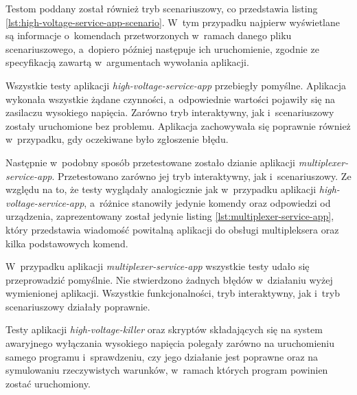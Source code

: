 Testom poddany został również tryb scenariuszowy, co przedstawia listing \ref{lst:high-voltage-service-app-scenario}. W~tym przypadku najpierw wyświetlane są informacje o~komendach przetworzonych w~ramach danego pliku scenariuszowego, a~dopiero później następuje ich uruchomienie, zgodnie ze specyfikacją zawartą w~argumentach wywołania aplikacji.



Wszystkie testy aplikacji \emph{high-voltage-service-app} przebiegły pomyślne. Aplikacja wykonała wszystkie żądane czynności, a~odpowiednie wartości pojawiły się na zasilaczu wysokiego napięcia. Zarówno tryb interaktywny, jak i~scenariuszowy zostały uruchomione bez problemu. Aplikacja zachowywała się poprawnie również w~przypadku, gdy oczekiwane było zgłoszenie błędu.

\clearpage
Następnie w~podobny sposób przetestowane zostało dzianie aplikacji \emph{multiplexer-service-app}. Przetestowano zarówno jej tryb interaktywny, jak i~scenariuszowy. Ze względu na to, że testy wyglądały analogicznie jak w~przypadku aplikacji \emph{high-voltage-service-app}, a~różnice stanowiły jedynie komendy oraz odpowiedzi od urządzenia, zaprezentowany został jedynie listing \ref{lst:multiplexer-service-app}, który przedstawia wiadomość powitalną aplikacji do obsługi multipleksera oraz kilka podstawowych komend.



W~przypadku aplikacji \emph{multiplexer-service-app} wszystkie testy udało się przeprowadzić pomyślnie. Nie stwierdzono żadnych błędów w~działaniu wyżej wymienionej aplikacji. Wszystkie funkcjonalności, tryb interaktywny, jak i~tryb scenariuszowy działały poprawnie.

\clearpage
Testy aplikacji \emph{high-voltage-killer} oraz skryptów składających się na system awaryjnego wyłączania wysokiego napięcia polegały zarówno na uruchomieniu samego programu i~sprawdzeniu, czy jego działanie jest poprawne oraz na symulowaniu rzeczywistych warunków, w~ramach których program powinien zostać uruchomiony. 

